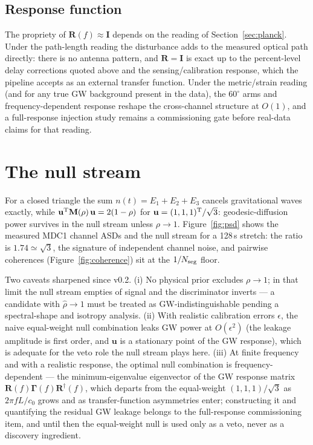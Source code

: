 \documentclass[11pt]{article}
\begin{document}
\subsection{Response function}
The propriety of $\mathbf{R}(f) \approx \mathbf{I}$ depends on the reading of Section~\ref{sec:planck}. Under the path-length reading the disturbance adds to the measured optical path directly: there is no antenna pattern, and $\mathbf{R} = \mathbf{I}$ is exact up to the percent-level delay corrections quoted above and the sensing/calibration response, which the pipeline accepts as an external transfer function. Under the metric/strain reading (and for any true GW background present in the data), the $60^\circ$ arms and frequency-dependent response reshape the cross-channel structure at $O(1)$, and a full-response injection study remains a commissioning gate before real-data claims for that reading.

\section{The null stream}
\label{sec:nullstream}

For a closed triangle the sum $n(t) = E_1 + E_2 + E_3$ cancels gravitational waves exactly, while $\mathbf{u}^{\rm T} \mathbf{M}(\rho)\, \mathbf{u} = 2(1-\rho)$ for $\mathbf{u} = (1,1,1)^{\rm T}/\sqrt{3}$: geodesic-diffusion power survives in the null stream unless $\rho \to 1$. Figure~\ref{fig:psd} shows the measured MDC1 channel ASDs and the null stream for a 128\,s stretch: the ratio is $1.74 \simeq \sqrt{3}$, the signature of independent channel noise, and pairwise coherences (Figure~\ref{fig:coherence}) sit at the $1/N_{\rm seg}$ floor.

Two caveats sharpened since v0.2. (i) No physical prior excludes $\rho \to 1$; in that limit the null stream empties of signal and the discriminator inverts --- a candidate with $\hat\rho \to 1$ must be treated as GW-indistinguishable pending a spectral-shape and isotropy analysis. (ii) With realistic calibration errors $\epsilon$, the naive equal-weight null combination leaks GW power at $O(\epsilon^2)$ (the leakage amplitude is first order, and $\mathbf{u}$ is a stationary point of the GW response), which is adequate for the veto role the null stream plays here. (iii) At finite frequency and with a realistic response, the optimal null combination is frequency-dependent --- the minimum-eigenvalue eigenvector of the GW response matrix $\mathbf{R}(f)\bm{\Gamma}(f)\mathbf{R}^\dagger(f)$, which departs from the equal-weight $(1,1,1)/\sqrt3$ as $2\pi f L/c_0$ grows and as transfer-function asymmetries enter; constructing it and quantifying the residual GW leakage belongs to the full-response commissioning item, and until then the equal-weight null is used only as a veto, never as a discovery ingredient.
\end{document}
